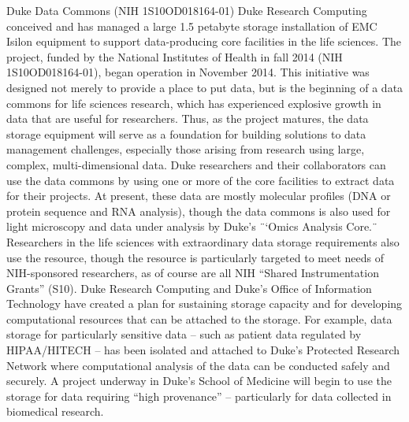 Duke Data Commons (NIH 1S10OD018164-01) Duke Research Computing conceived and has managed a large 1.5 petabyte storage installation of EMC Isilon equipment to support data-producing core facilities in the life sciences. The project, funded by the National Institutes of Health in fall 2014 (NIH 1S10OD018164-01), began operation in November 2014. This initiative was designed not merely to provide a place to put data, but is the beginning of a data commons for life sciences research, which has experienced explosive growth in data that are useful for researchers. Thus, as the project matures, the data storage equipment will serve as a foundation for building solutions to data management challenges, especially those arising from research using large, complex, multi-dimensional data. Duke researchers and their collaborators can use the data commons by using one or more of the core facilities to extract data for their projects. At present, these data are mostly molecular profiles (DNA or protein sequence and RNA analysis), though the data commons is also used for light microscopy and data under analysis by Duke's ¨`Omics Analysis Core.¨ Researchers in the life sciences with extraordinary data storage requirements also use the resource, though the resource is particularly targeted to meet needs of NIH-sponsored researchers, as of course are all NIH “Shared Instrumentation Grants” (S10). Duke Research Computing and Duke's Office of Information Technology have created a plan for sustaining storage capacity and for developing computational resources that can be attached to the storage. For example, data storage for particularly sensitive data – such as patient data regulated by HIPAA/HITECH – has been isolated and attached to Duke's Protected Research Network where computational analysis of the data can be conducted safely and securely. A project underway in Duke's School of Medicine will begin to use the storage for data requiring “high provenance” – particularly for data collected in biomedical research.
 





